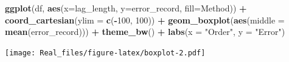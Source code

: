 \documentclass[
]{article}
\newenvironment{Shaded}{\begin{snugshade}}{\end{snugshade}}
\newcommand{\DataTypeTok}[1]{\textcolor[rgb]{0.13,0.29,0.53}{#1}}
\newcommand{\DecValTok}[1]{\textcolor[rgb]{0.00,0.00,0.81}{#1}}
\newcommand{\KeywordTok}[1]{\textcolor[rgb]{0.13,0.29,0.53}{\textbf{#1}}}
\newcommand{\NormalTok}[1]{#1}
\newcommand{\OperatorTok}[1]{\textcolor[rgb]{0.81,0.36,0.00}{\textbf{#1}}}
\newcommand{\StringTok}[1]{\textcolor[rgb]{0.31,0.60,0.02}{#1}}
\begin{document}
\begin{Shaded}
\begin{Highlighting}[]
\KeywordTok{ggplot}\NormalTok{(df, }\KeywordTok{aes}\NormalTok{(}\DataTypeTok{x=}\NormalTok{lag_length, }\DataTypeTok{y=}\NormalTok{error_record, }\DataTypeTok{fill=}\NormalTok{Method)) }\OperatorTok{+}
\StringTok{  }\KeywordTok{coord_cartesian}\NormalTok{(}\DataTypeTok{ylim =} \KeywordTok{c}\NormalTok{(}\OperatorTok{-}\DecValTok{100}\NormalTok{, }\DecValTok{100}\NormalTok{)) }\OperatorTok{+}
\StringTok{  }\KeywordTok{geom_boxplot}\NormalTok{(}\KeywordTok{aes}\NormalTok{(}\DataTypeTok{middle =} \KeywordTok{mean}\NormalTok{(error_record))) }\OperatorTok{+}\StringTok{ }\KeywordTok{theme_bw}\NormalTok{() }\OperatorTok{+}\StringTok{ }
\StringTok{  }\KeywordTok{labs}\NormalTok{(}\DataTypeTok{x =} \StringTok{"Order"}\NormalTok{, }\DataTypeTok{y =}  \StringTok{"Error"}\NormalTok{)}
\end{Highlighting}
\end{Shaded}

\texttt{[image: Real\_files/figure-latex/boxplot-2.pdf]}
\end{document}
